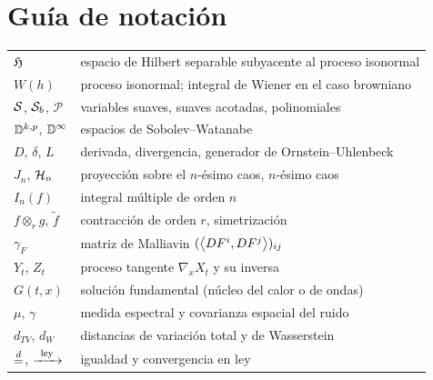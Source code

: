 \chapter{Guía de notación}\label{ap:notacion}

\begin{center}
\renewcommand{\arraystretch}{1.25}
\begin{tabular}{p{3.5cm}p{10cm}}
\toprule
$\mathfrak{H}$ & espacio de Hilbert separable subyacente al proceso isonormal\\
$W(h)$ & proceso isonormal; integral de Wiener en el caso browniano\\
$\mathcal{S}$, $\mathcal{S}_b$, $\mathcal P$ & variables suaves, suaves acotadas, polinomiales\\
$\mathbb{D}^{k,p}$, $\mathbb{D}^\infty$ & espacios de Sobolev--Watanabe\\
$D$, $\delta$, $L$ & derivada, divergencia, generador de Ornstein--Uhlenbeck\\
$J_n$, $\mathcal{H}_n$ & proyección sobre el $n$-ésimo caos, $n$-ésimo caos\\
$I_n(f)$ & integral múltiple de orden $n$\\
$f\otimes_rg$, $\tilde f$ & contracción de orden $r$, simetrización\\
$\gamma_F$ & matriz de Malliavin $(\left\langle DF^i, DF^j\right\rangle)_{ij}$\\
$Y_t$, $Z_t$ & proceso tangente $\nabla_xX_t$ y su inversa\\
$G(t,x)$ & solución fundamental (núcleo del calor o de ondas)\\
$\mu$, $\gamma$ & medida espectral y covarianza espacial del ruido\\
$d_{TV}$, $d_W$ & distancias de variación total y de Wasserstein\\
$\overset{d}{=}$, $\xrightarrow{\ \mathrm{ley}\ }$ & igualdad y convergencia en ley\\
\bottomrule
\end{tabular}
\end{center}
